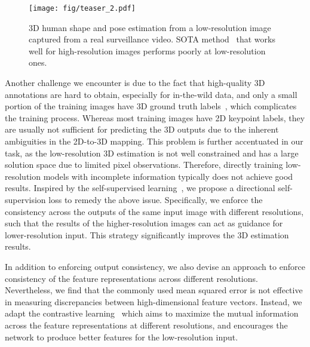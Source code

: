 \documentclass[runningheads]{llncs}
\begin{document}
\begin{figure}[t]
	\centering
\texttt{[image: fig/teaser\_2.pdf]} 
\caption{3D human shape and pose estimation from a low-resolution image captured from a real surveillance video. SOTA
	method~\cite{kolotouros2019spin} that works well for high-resolution images performs poorly at low-resolution ones.
}
\label{fig:teaser_real}
\end{figure}


Another challenge we encounter is due to the fact that high-quality 3D annotations are hard to obtain, especially for in-the-wild data, and only a small portion of the training images have 3D ground truth labels~\cite{kanazawa2018end,kolotouros2019spin}, which complicates the training process.
Whereas most training images have 2D keypoint labels, they are usually not sufficient for predicting the 3D outputs due to the inherent ambiguities in the 2D-to-3D mapping.
This problem is further accentuated in our task, as the low-resolution 3D estimation is not well constrained and has a large solution space due to limited pixel observations.
Therefore, directly training low-resolution models with incomplete information typically does not achieve good results.
Inspired by the self-supervised learning~\cite{laine2017temporal,tarvainen2017mean}, we propose a directional self-supervision loss to remedy the above issue.
Specifically, we enforce the consistency across the outputs of the same input image with different resolutions, such that the results of the higher-resolution images can act as guidance for lower-resolution input. This strategy significantly improves the 3D estimation results.







In addition to enforcing output consistency, we also devise an approach to enforce consistency of the feature representations across different resolutions. 
Nevertheless, we find that the commonly used mean squared error is not effective in measuring discrepancies between high-dimensional feature vectors. 
Instead, we adapt the contrastive learning~\cite{oord2018representation,he2019momentum,chen2020simple} which aims to maximize the mutual information across the feature representations at different resolutions, and encourages the network to produce better features for the low-resolution input.
\end{document}
